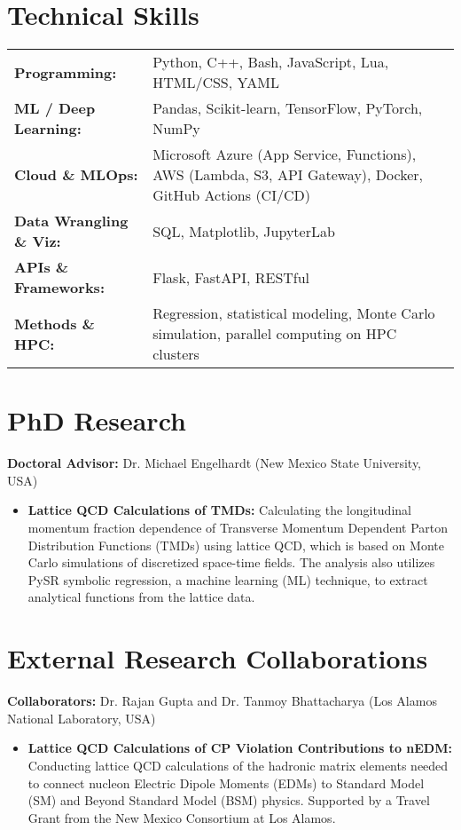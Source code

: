 \documentclass[11pt]{article}
\begin{document}
\section*{Technical Skills}
\vspace{-0.5em}
\begin{tabularx}{\textwidth}{@{}lX@{}}
\textbf{Programming:}          & Python, C++, Bash, JavaScript, Lua, HTML/CSS, YAML \\
\textbf{ML / Deep Learning:}   & Pandas, Scikit-learn, TensorFlow, PyTorch, NumPy \\
\textbf{Cloud \& MLOps:}       & Microsoft Azure (App Service, Functions), AWS (Lambda, S3, API Gateway), Docker, GitHub Actions (CI/CD) \\
\textbf{Data Wrangling \& Viz:}& SQL, Matplotlib, JupyterLab \\
\textbf{APIs \& Frameworks:}   & Flask, FastAPI, RESTful \\
\textbf{Methods \& HPC:}       & Regression, statistical modeling, Monte Carlo simulation, parallel computing on HPC clusters \\
\end{tabularx}



\section*{PhD Research}
\vspace{-0.3em}
\textbf{Doctoral Advisor:} Dr. Michael Engelhardt (New Mexico State University, USA)
\begin{itemize}
    \item \textbf{Lattice QCD Calculations of TMDs:} Calculating the longitudinal momentum fraction dependence of Transverse Momentum Dependent Parton Distribution Functions (TMDs) using lattice QCD, which is based on Monte Carlo simulations of discretized space-time fields. The analysis also utilizes PySR symbolic regression, a machine learning (ML) technique, to extract analytical functions from the lattice data.
\end{itemize}

\section*{External Research Collaborations}
\vspace{-0.3em}
\textbf{Collaborators:} Dr. Rajan Gupta and Dr. Tanmoy Bhattacharya (Los Alamos National Laboratory, USA)
\begin{itemize}
    \item \textbf{Lattice QCD Calculations of CP Violation Contributions to nEDM:} Conducting lattice QCD calculations of the hadronic matrix elements needed to connect nucleon Electric Dipole Moments (EDMs) to Standard Model (SM) and Beyond Standard Model (BSM) physics. Supported by a Travel Grant from the New Mexico Consortium at Los Alamos.
\end{itemize}
\end{document}
